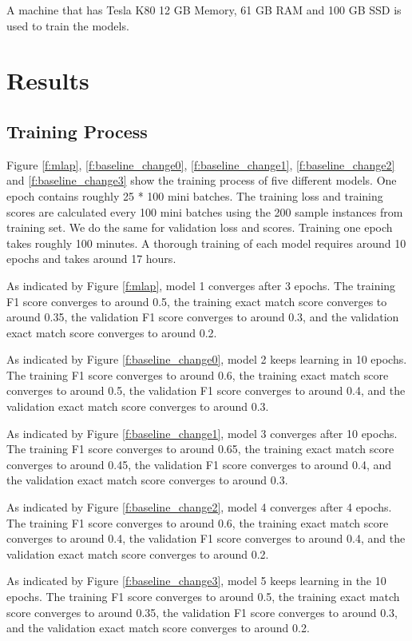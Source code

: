 \documentclass[modernstyle,12pt]{sjsuthesis}
\theoremstyle{definition}
\begin{document}
A machine that has Tesla K80 12 GB Memory, 61 GB RAM and 100 GB SSD is used to train the models.

\section{Results}
\subsection{Training Process}

Figure \ref{f:mlap}, \ref{f:baseline_change0}, \ref{f:baseline_change1}, \ref{f:baseline_change2} and \ref{f:baseline_change3} show the training process of five different models. One epoch contains roughly 25 * 100 mini batches. The training loss and training scores are calculated every 100 mini batches using the 200 sample instances from training set. We do the same for validation loss and scores. Training one epoch takes roughly 100 minutes. A thorough training of each model requires around 10 epochs and takes around 17 hours.

As indicated by Figure \ref{f:mlap}, model 1 converges after 3 epochs. The training F1 score converges to around 0.5, the training exact match score converges to around 0.35, the validation F1 score converges to around 0.3, and the validation exact match score converges to around 0.2.

As indicated by Figure \ref{f:baseline_change0}, model 2 keeps learning in 10 epochs. The training F1 score converges to around 0.6, the training exact match score converges to around 0.5, the validation F1 score converges to around 0.4, and the validation exact match score converges to around 0.3.

As indicated by Figure \ref{f:baseline_change1}, model 3 converges after 10 epochs. The training F1 score converges to around 0.65, the training exact match score converges to around 0.45, the validation F1 score converges to around 0.4, and the validation exact match score converges to around 0.3.

As indicated by Figure \ref{f:baseline_change2}, model 4 converges after 4 epochs. The training F1 score converges to around 0.6, the training exact match score converges to around 0.4, the validation F1 score converges to around 0.4, and the validation exact match score converges to around 0.2.

As indicated by Figure \ref{f:baseline_change3}, model 5 keeps learning in the 10 epochs. The training F1 score converges to around 0.5, the training exact match score converges to around 0.35, the validation F1 score converges to around 0.3, and the validation exact match score converges to around 0.2.
\end{document}
